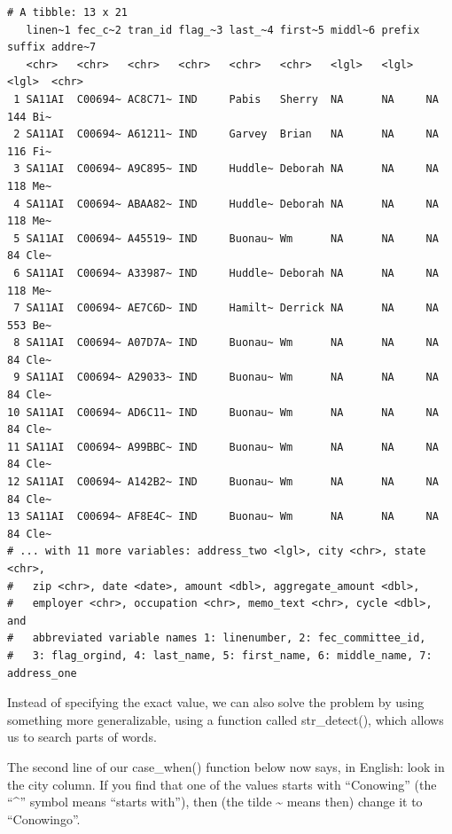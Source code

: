 \documentclass[
  letterpaper,
  DIV=11,
  numbers=noendperiod]{scrreprt}
\begin{document}
\begin{verbatim}
# A tibble: 13 x 21
   linen~1 fec_c~2 tran_id flag_~3 last_~4 first~5 middl~6 prefix suffix addre~7
   <chr>   <chr>   <chr>   <chr>   <chr>   <chr>   <lgl>   <lgl>  <lgl>  <chr>  
 1 SA11AI  C00694~ AC8C71~ IND     Pabis   Sherry  NA      NA     NA     144 Bi~
 2 SA11AI  C00694~ A61211~ IND     Garvey  Brian   NA      NA     NA     116 Fi~
 3 SA11AI  C00694~ A9C895~ IND     Huddle~ Deborah NA      NA     NA     118 Me~
 4 SA11AI  C00694~ ABAA82~ IND     Huddle~ Deborah NA      NA     NA     118 Me~
 5 SA11AI  C00694~ A45519~ IND     Buonau~ Wm      NA      NA     NA     84 Cle~
 6 SA11AI  C00694~ A33987~ IND     Huddle~ Deborah NA      NA     NA     118 Me~
 7 SA11AI  C00694~ AE7C6D~ IND     Hamilt~ Derrick NA      NA     NA     553 Be~
 8 SA11AI  C00694~ A07D7A~ IND     Buonau~ Wm      NA      NA     NA     84 Cle~
 9 SA11AI  C00694~ A29033~ IND     Buonau~ Wm      NA      NA     NA     84 Cle~
10 SA11AI  C00694~ AD6C11~ IND     Buonau~ Wm      NA      NA     NA     84 Cle~
11 SA11AI  C00694~ A99BBC~ IND     Buonau~ Wm      NA      NA     NA     84 Cle~
12 SA11AI  C00694~ A142B2~ IND     Buonau~ Wm      NA      NA     NA     84 Cle~
13 SA11AI  C00694~ AF8E4C~ IND     Buonau~ Wm      NA      NA     NA     84 Cle~
# ... with 11 more variables: address_two <lgl>, city <chr>, state <chr>,
#   zip <chr>, date <date>, amount <dbl>, aggregate_amount <dbl>,
#   employer <chr>, occupation <chr>, memo_text <chr>, cycle <dbl>, and
#   abbreviated variable names 1: linenumber, 2: fec_committee_id,
#   3: flag_orgind, 4: last_name, 5: first_name, 6: middle_name, 7: address_one
\end{verbatim}

Instead of specifying the exact value, we can also solve the problem by
using something more generalizable, using a function called
str\_detect(), which allows us to search parts of words.

The second line of our case\_when() function below now says, in English:
look in the city column. If you find that one of the values starts with
``Conowing'' (the ``\^{}'' symbol means ``starts with''), then (the
tilde \textasciitilde{} means then) change it to ``Conowingo''.
\end{document}
